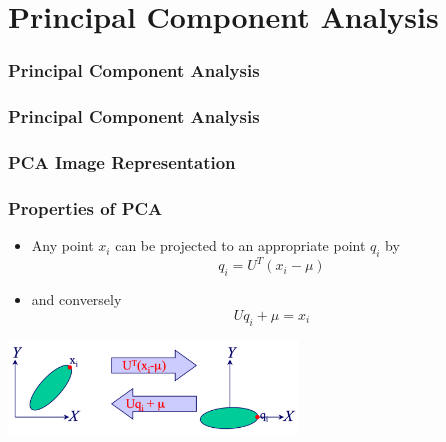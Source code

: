 \documentclass[10pt]{beamer}
\begin{document}
\section{Principal Component Analysis}
\label{sec:pca}

\begin{frame}
  \frametitle{Principal Component Analysis}
\end{frame}

\begin{frame}
  \frametitle{Principal Component Analysis}
\end{frame}


\begin{frame}
  \frametitle{PCA Image Representation}
\end{frame}

\begin{frame}
  \frametitle{Properties of PCA}
  \begin{itemize}
  \item Any point $x_i$ can be projected to an appropriate point $q_i$ by
    \[ q_i = U^T (x_i - \mu ) \]
  \item and conversely
    \[ U q_i + \mu = x_i \]
  \end{itemize}
  \centerline{\includegraphics[height=2.5cm]{pca-properties}}
\end{frame}
\end{document}
